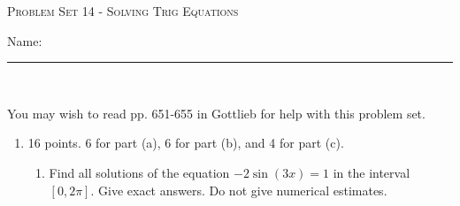 \documentclass{article}
\begin{document}
\begin{center}
  \large\textsc{Problem Set 14 - Solving Trig Equations}
  
      \pspace{12pt}
  \begin{problemonly}\large Name: \rule{5cm}{0.15mm}\\ \end{problemonly}
\end{center}


    You may wish to read pp. 651-655 in Gottlieb for help with this problem set.


\begin{enumerate}
\item 

\begin{grading}
16 points. 6 for part (a), 6 for part (b), and 4 for part (c).
\end{grading}

\begin{enumerate}
  \item
    \begin{problem}[\stretch{2}]
      Find all solutions of the equation $-2\sin(3x) = 1$ in the interval
      $[0, 2 \pi]$.  Give exact answers. Do not give numerical estimates.
    \end{problem}


\end{enumerate}
\end{enumerate}
\end{document}
